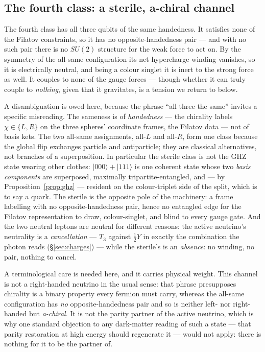 \subsection{The fourth class: a sterile, a-chiral channel}

The fourth class has all three qubits of the same handedness. It satisfies none of the Filatov
constraints, so it has no opposite-handedness pair --- and with no such pair there is no $SU(2)$
structure for the weak force to act on. By the symmetry of the all-same configuration its net
hypercharge winding vanishes, so it is electrically neutral, and being a colour singlet it is inert
to the strong force as well. It couples to none of the gauge forces --- though whether it can truly
couple to \emph{nothing}, given that it gravitates, is a tension we return to below.

A disambiguation is owed here, because the phrase ``all three the same'' invites a specific
misreading. The sameness is of \emph{handedness} --- the chirality labels $\chi \in \{L, R\}$ on
the three spheres' coordinate frames, the Filatov data --- not of basis kets. The two all-same
assignments, all-$L$ and all-$R$, form one class because the global flip exchanges particle and
antiparticle; they are classical alternatives, not branches of a superposition. In particular the
sterile class is not the GHZ state wearing other clothes: $\lvert 000\rangle + \lvert 111\rangle$
is one coherent state whose two \emph{basis components} are superposed, maximally
tripartite-entangled, and --- by Proposition~\ref{prop:ghz} --- resident on the colour-triplet side
of the split, which is to say a quark. The sterile is the opposite pole of the machinery: a frame
labelling with no opposite-handedness pair, hence no entangled edge for the Filatov representation
to draw, colour-singlet, and blind to every gauge gate. And the two neutral leptons are neutral for
different reasons: the active neutrino's neutrality is a \emph{cancellation} --- $T_3$ against
$\tfrac12 Y$ in exactly the combination the photon reads (\S\ref{sec:charges}) --- while the
sterile's is an \emph{absence}: no winding, no pair, nothing to cancel.

A terminological care is needed here, and it carries physical weight. This channel is not a
right-handed neutrino in the usual sense: that phrase presupposes chirality is a binary property
every fermion must carry, whereas the all-same configuration has \emph{no} opposite-handedness pair
and so is neither left- nor right-handed but \emph{a-chiral}. It is not the parity partner of the
active neutrino, which is why one standard objection to any dark-matter reading of such a state ---
that parity restoration at high energy should regenerate it --- would not apply: there is nothing
for it to be the partner of.

